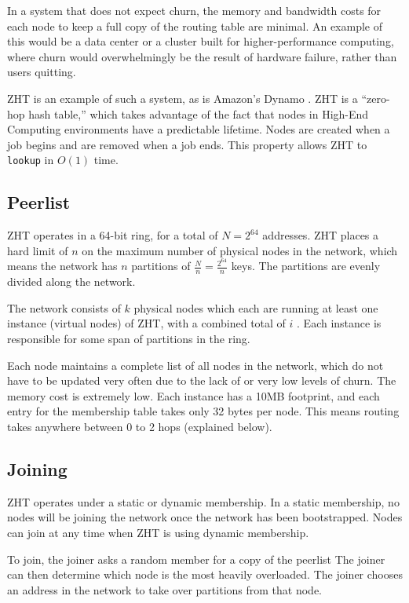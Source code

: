 \documentclass[10pt,letterpaper,twoside]{report}
\begin{document}
In a system that does not expect churn, the memory and bandwidth costs for each node to keep a full copy of the routing table are minimal.
An example of this would be a data center or a cluster built for higher-performance computing, where churn would overwhelmingly be the result of hardware failure, rather than users quitting.

ZHT \cite{li2013zht} is an example of such a system, as is Amazon's Dynamo \cite{dynamo}.
ZHT is a ``zero-hop hash table,'' which takes advantage of the fact that  nodes in  High-End Computing environments have a predictable lifetime.
Nodes are created when a job begins and are removed when a job ends.
This property allows ZHT to \texttt{lookup} in $ O(1) $ time.

\subsection*{Peerlist}

ZHT operates in a 64-bit ring, for a total of $N = 2^{64}$ addresses.
ZHT places a  hard limit of $ n $ on the maximum number of physical nodes in the network, which means the network has $n$ partitions of $\frac{N}{n} =  \frac{2^{64}}{n}$ keys.
The partitions are evenly divided along the network.

The network consists of $k$ physical nodes which each are running at least one instance (virtual nodes) of ZHT, with a combined total of $i$ .
Each instance is responsible for some span of partitions in the ring.


Each node maintains a complete list of all nodes in the network, which do not have to be updated very often due to the lack of or very low levels of churn.
The memory cost is extremely low.
Each instance has a 10MB footprint, and each entry for the membership table takes only 32 bytes per node.
This means routing takes anywhere between 0 to 2 hops (explained below).

\subsection*{Joining}
ZHT operates under a static or dynamic membership.
In a static membership, no nodes will be joining the network once the network has been bootstrapped.
Nodes can join at any time when ZHT is using dynamic membership.

To join, the joiner asks a random member for a copy of the peerlist 
The joiner can then determine which node is the most heavily overloaded.
The joiner chooses an address in the network to take over partitions from that node.
\end{document}
